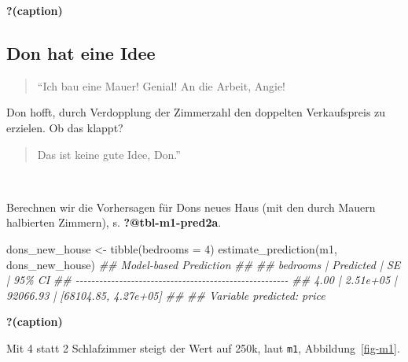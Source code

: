 \documentclass[
  a4paper,
  DIV=11]{scrreprt}
\newenvironment{Shaded}{\begin{snugshade}}{\end{snugshade}}
\newcommand{\AttributeTok}[1]{\textcolor[rgb]{0.40,0.45,0.13}{#1}}
\newcommand{\DecValTok}[1]{\textcolor[rgb]{0.68,0.00,0.00}{#1}}
\newcommand{\DocumentationTok}[1]{\textcolor[rgb]{0.37,0.37,0.37}{\textit{#1}}}
\newcommand{\FunctionTok}[1]{\textcolor[rgb]{0.28,0.35,0.67}{#1}}
\newcommand{\NormalTok}[1]{\textcolor[rgb]{0.00,0.23,0.31}{#1}}
\newcommand{\OtherTok}[1]{\textcolor[rgb]{0.00,0.23,0.31}{#1}}
\theoremstyle{definition}
\theoremstyle{remark}
\begin{document}
\begin{table}

\caption{\textbf{?(caption)}}

\end{table}

\hypertarget{don-hat-eine-idee}{%
\subsection{Don hat eine Idee}\label{don-hat-eine-idee}}

\begin{quote}
``Ich bau eine Mauer! Genial! An die Arbeit, Angie! 🧑
\end{quote}

Don hofft, durch Verdopplung der Zimmerzahl den doppelten Verkaufspreis
zu erzielen. Ob das klappt?

\begin{quote}
Das ist keine gute Idee, Don.''
\end{quote}

👩

Berechnen wir die Vorhersagen für Dons neues Haus (mit den durch Mauern
halbierten Zimmern), s. \textbf{?@tbl-m1-pred2a}.

\begin{Shaded}
\begin{Highlighting}[]
\NormalTok{dons\_new\_house }\OtherTok{\textless{}{-}} \FunctionTok{tibble}\NormalTok{(}\AttributeTok{bedrooms =} \DecValTok{4}\NormalTok{)}
\FunctionTok{estimate\_prediction}\NormalTok{(m1, dons\_new\_house)}
\DocumentationTok{\#\# Model{-}based Prediction}
\DocumentationTok{\#\# }
\DocumentationTok{\#\# bedrooms | Predicted |       SE |               95\% CI}
\DocumentationTok{\#\# {-}{-}{-}{-}{-}{-}{-}{-}{-}{-}{-}{-}{-}{-}{-}{-}{-}{-}{-}{-}{-}{-}{-}{-}{-}{-}{-}{-}{-}{-}{-}{-}{-}{-}{-}{-}{-}{-}{-}{-}{-}{-}{-}{-}{-}{-}{-}{-}{-}{-}{-}{-}{-}{-}}
\DocumentationTok{\#\# 4.00     |  2.51e+05 | 92066.93 | [68104.85, 4.27e+05]}
\DocumentationTok{\#\# }
\DocumentationTok{\#\# Variable predicted: price}
\end{Highlighting}
\end{Shaded}

\begin{table}

\caption{\textbf{?(caption)}}

\end{table}

Mit 4 statt 2 Schlafzimmer steigt der Wert auf 250k, laut \texttt{m1},
Abbildung~\ref{fig-m1}.
\end{document}
